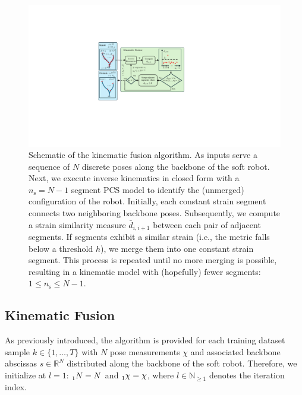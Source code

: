
\begin{figure}
    \centering
    \includegraphics[width=0.7\linewidth]{pcsregression/figures/diagram_kinematic_fusion_v3_cropped.pdf}
    \caption{Schematic of the kinematic fusion algorithm. As inputs serve a sequence of $N$ discrete poses along the backbone of the soft robot. Next, we execute inverse kinematics in closed form with a $n_\mathrm{s} = N-1$ segment \gls{PCS} model to identify the (unmerged) configuration of the robot. Initially, each constant strain segment connects two neighboring backbone poses. Subsequently, we compute a strain similarity measure $\bar{d}_{i,i+1}$ between each pair of adjacent segments. If segments exhibit a similar strain (i.e., the metric falls below a threshold $h$), we merge them into one constant strain segment. This process is repeated until no more merging is possible, resulting in a kinematic model with (hopefully) fewer segments: $1 \leq n_\mathrm{s} \leq N-1$.}
    \label{fig:pcsregression:kin_regr}
\end{figure}

\subsection{Kinematic Fusion}
As previously introduced, the algorithm is provided for each training dataset sample $k \in \{1, \dots, T\}$ with $N$ pose measurements $\chi$ and associated backbone abscissas $s \in \mathbb{R}^N$ distributed along the backbone of the soft robot.
Therefore, we initialize at $l=1$: $\prescript{}{1}{N} = N$ and $\prescript{}{1}{\chi} = \chi$, where $l \in \mathbb{N}_{\geq 1}$ denotes the iteration index.

